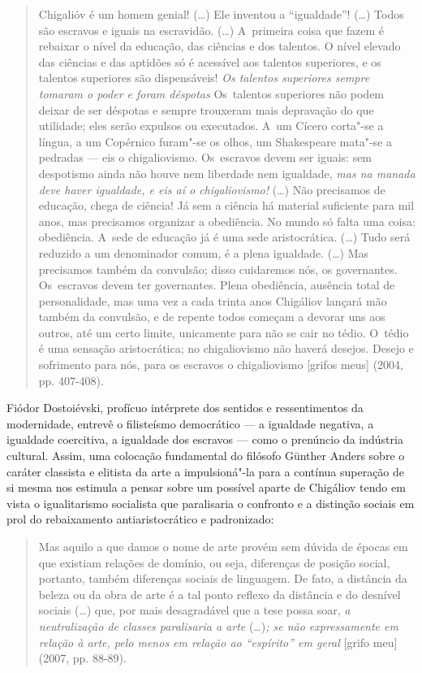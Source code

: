 \begin{quote}
Chigalióv é um homem genial! (\ldots) Ele inventou a ``igualdade''! (\ldots)
Todos são escravos e iguais na escravidão. (\ldots) A~primeira coisa que
fazem é rebaixar o nível da educação, das ciências e dos talentos. O
nível elevado das ciências e das aptidões só é acessível aos talentos
superiores, e os talentos superiores são dispensáveis! \emph{Os talentos
superiores sempre tomaram o poder e foram déspotas} Os~talentos
superiores não podem deixar de ser déspotas e sempre trouxeram mais
depravação do que utilidade; eles serão expulsos ou executados. A~um
Cícero corta"-se a língua, a um Copérnico furam"-se os olhos, um
Shakespeare mata"-se a pedradas --- eis o chigaliovismo. Os~escravos devem
ser iguais: sem despotismo ainda não houve nem liberdade nem igualdade,
\emph{mas na manada deve haver igualdade, e eis aí o chigaliovismo!}
(\ldots) Não precisamos de educação, chega de ciência! Já sem a ciência há
material suficiente para mil anos, mas precisamos organizar a
obediência. No mundo só falta uma coisa: obediência. A~sede de educação
já é uma sede aristocrática. (\ldots) Tudo será reduzido a um denominador
comum, é a plena igualdade. (\ldots) Mas precisamos também da convulsão;
disso cuidaremos nós, os governantes. Os~escravos devem ter governantes.
Plena obediência, ausência total de personalidade, mas uma vez a cada
trinta anos Chigáliov lançará mão também da convulsão, e de repente
todos começam a devorar uns aos outros, até um certo limite, unicamente
para não se cair no tédio. O~tédio é uma sensação aristocrática; no
chigaliovismo não haverá desejos. Desejo e sofrimento para nós, para os
escravos o chigaliovismo {[}grifos meus{]} (2004, pp. 407-408).
\end{quote}

Fiódor Dostoiévski, profícuo intérprete dos sentidos e ressentimentos da
modernidade, entrevê o filisteísmo democrático --- a igualdade negativa,
a igualdade coercitiva, a igualdade dos escravos --- como o prenúncio da
indústria cultural. Assim, uma colocação fundamental do filósofo Günther
Anders sobre o caráter classista e elitista da arte a impulsioná"-la para
a contínua superação de si mesma nos estimula a pensar sobre um possível
aparte de Chigáliov tendo em vista o igualitarismo socialista que
paralisaria o confronto e a distinção sociais em prol do rebaixamento
antiaristocrático e padronizado:

\begin{quote}
Mas aquilo a que damos o nome de arte provém sem dúvida de épocas em que
existiam relações de domínio, ou seja, diferenças de posição social,
portanto, também diferenças sociais de linguagem. De fato, a distância
da beleza ou da obra de arte é a tal ponto reflexo da distância e do
desnível sociais (\ldots) que, por mais desagradável que a tese possa soar,
\emph{a neutralização de classes paralisaria a arte} (\ldots)\emph{; se não
expressamente em relação à arte, pelo menos em relação ao ``espírito''
em geral} {[}grifo meu{]} (2007, pp. 88-89).
\end{quote}

